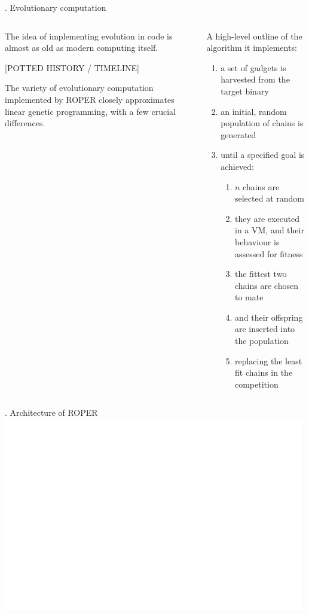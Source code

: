 \documentclass[9pt]{beamer}
\begin{document}
\begin{frame}{\theframenumber. Evolutionary computation}
  \begin{columns}
    \begin{column}{.5\textwidth}
      The idea of implementing evolution in code is almost as old as modern computing itself.
      \vspace{8pt}

      [POTTED HISTORY / TIMELINE]



      The variety of evolutionary computation implemented by ROPER closely approximates linear genetic programming, with a few crucial differences.

    \end{column}
    \begin{column}{.5\textwidth}

      A high-level outline of the algorithm it implements:
      \begin{enumerate}
      \item a set of gadgets is harvested from the target binary
      \item an initial, random population of chains is generated
      \item until a specified goal is achieved:
        \begin{enumerate}
        \item $n$ chains are selected at random
        \item they are executed in a VM, and their behaviour is assessed for fitness
        \item the fittest two chains are chosen to mate
        \item and their offspring are inserted into the population
        \item replacing the least fit chains in the competition
        \end{enumerate}
      \end{enumerate}
    \end{column}
  \end{columns}
\end{frame}

\begin{frame}{\theframenumber. Architecture of ROPER}
      \includegraphics[width=\textwidth]{../images/architecture-transparent.png}
\end{frame}
\end{document}
